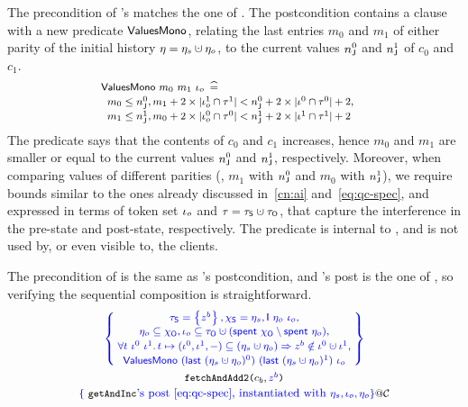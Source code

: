 \noindent
The precondition of 's matches the one of
. The postcondition contains a clause with a new
predicate $\bapprox$, relating the last entries $m_0$ and $m_1$ of
either parity of the initial history $\gist = \gists \hunion \gisto$,
to the current values $n_\joint^0$ and $n_\joint^1$ of $c_0$ and
$c_1$.
%
\[
%
\!\!\!\!
{\small{
\begin{array}{l}
\bapprox~m_0~m_1~\ikno \eqdef \\[2pt]
%
  \begin{array}{l}
   m_0 \le n_\joint^0\aand
    m_1 + 2 \times |\ikno^1 \cap \tkn^1| < n_\joint^0 + 2 \times
  |\ikn^0 \cap  \tkn^0| + 2, \\[2pt]
   m_1 \le n_\joint^1\aand m_0 + 2 \times |\ikno^0 \cap \tkn^0| < n_\joint^1 + 2 \times
  |\ikn^1 \cap  \tkn^1| + 2 
  \end{array}
\end{array}
\hfill
}}
\]
%
The predicate says that the contents of $c_0$ and $c_1$ increases,
hence $m_0$ and $m_1$ are smaller or equal to the current values
$n_\joint^0$ and $n_\joint^1$, respectively. Moreover, when comparing
values of different parities (\ie, $m_1$ with $n_\joint^0$ and $m_0$
with $n_\joint^1$), we require bounds similar to the ones already
discussed in~\ref{cn:ai} and~\eqref{eq:qc-spec}, and expressed in
terms of token set $\ikno$ and $\tkn = \tkns \hunion \tkno$, that
capture the interference in the pre-state and post-state,
respectively. The predicate is internal to , and is not
used by, or even visible to, the clients.

The precondition of  is the same as 's
postcondition, and 's post is the one of
, so verifying the sequential composition is
straightforward.
%
%
\[
%
{\small
\begin{array}{c}
  \spec{\!\!
  \begin{array}{c}
   \tkns = \set{z^b}\aand \hists = \gists, 
     \Ic{\gisto}{\ikno} \aand   \\[2pt]
    \gisto \subseteq \histo, \ikno  \subseteq \tkno \hunion (\Tomb~\histo \setminus \Tomb~\gisto),\\[2pt]
    \forall t~\ikn^0~\ikn^1 \ldot
    t \hpts (\ikn^0, \ikn^1, -) \subseteq (\gists \hunion \gisto) \Rightarrow z^b \notin \ikn^0 \hunion \ikn^1,
    \\[2pt]    
    \bapprox~(\last~(\gists \hunion \gisto)^0)~(\last~(\gists \hunion \gisto)^1)~\ikno 
  \end{array}
  \!\!}
  \\\\[-5pt]
  \texttt{fetchAndAdd2($c_b, \specK{z^b}$)} 
  \\[3pt]
  {\normalsize{ 
  \specK{\{}~ {\small\texttt{getAndInc}}\specK{\text{'s post~\eqref{eq:qc-spec},
  instantiated with}~\gists, \ikno, \gisto\}}@\ccon
  }}
%
\end{array}
}
\]

